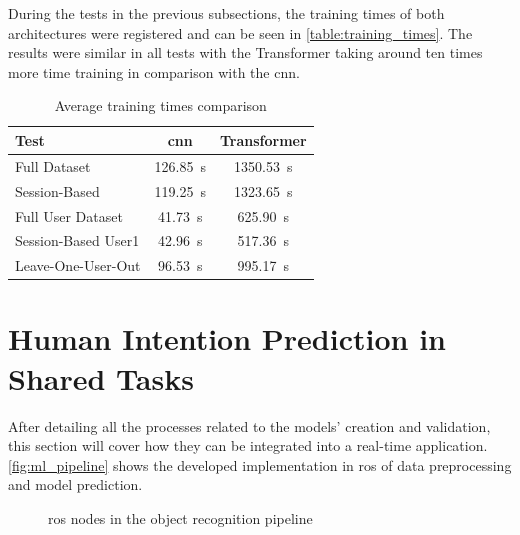 During the tests in the previous subsections, the training times of both architectures were registered and can be seen in \autoref{table:training_times}. The results were similar in all tests with the Transformer taking around ten times more time training in comparison with the \acs{cnn}.

\begin{table}[ht]
    \centering
    \caption{Average training times comparison}
    \label{table:training_times}
    \begin{tabular}{lcc}
        \toprule
        Test & \acs{cnn} & Transformer \\
        \midrule
        Full Dataset & \SI{126.85}{\second} & \SI{1350.53}{\second} \\
        Session-Based & \SI{119.25}{\second} & \SI{1323.65}{\second} \\
        Full User Dataset & \SI{41.73}{\second} & \SI{625.90}{\second} \\
        Session-Based User1 & \SI{42.96}{\second} & \SI{517.36}{\second} \\
        Leave-One-User-Out & \SI{96.53}{\second} & \SI{995.17}{\second} \\
        \bottomrule
    \end{tabular}
\end{table}

\section{Human Intention Prediction in Shared Tasks}
\label{section:human_intention_prediction}

After detailing all the processes related to the models' creation and validation, this section will cover how they can be integrated into a real-time application. \autoref{fig:ml_pipeline} shows the developed implementation in \acs{ros} of data preprocessing and model prediction.

\begin{figure}[ht]
    \centering
    
    \caption{\acs{ros} nodes in the object recognition pipeline}
    \label{fig:ml_pipeline}
\end{figure}

